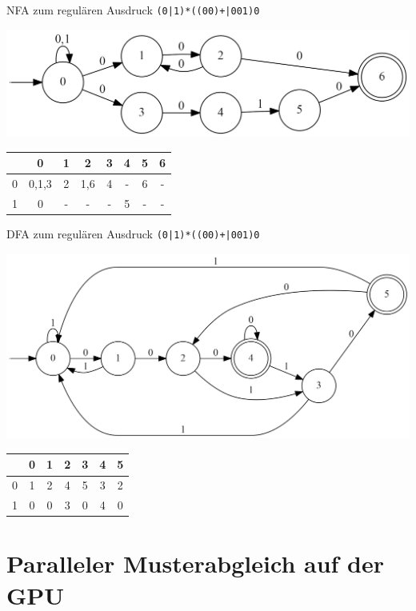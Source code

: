 \documentclass{beamer}
\begin{document}
	\begin{frame}{NFA zum regulären Ausdruck \texttt{(0|1)*((00)+|001)0}}
		\centering 
		
		\includegraphics[width=\textwidth]{./nfa_beispiel.png}
		
		\vfill
		
		\begin{tabular}{ c | c c c c c c c}
			 & 0 & 1 & 2 & 3 & 4 & 5 & 6 \\
			\hline
			0 & 0,1,3 & 2 & 1,6 & 4 & - & 6 & - \\
			1 & 0 & - & - & - & 5 & - & - 
		\end{tabular}
	\end{frame}

	\begin{frame}{DFA zum regulären Ausdruck \texttt{(0|1)*((00)+|001)0}}
		\centering
		
		\includegraphics[width=\textwidth]{./dfa_beispiel.png}
		
		\vfill
		
		\begin{tabular}{c | c c c c c c}
			 & 0 & 1 & 2 & 3 & 4 & 5 \\
			\hline
			0 & 1 & 2 & 4 & 5 & 3 & 2 \\
			1 & 0 & 0 & 3 & 0 & 4 & 0
		\end{tabular}
	\end{frame}

	\section{Paralleler Musterabgleich auf der GPU}
\end{document}
